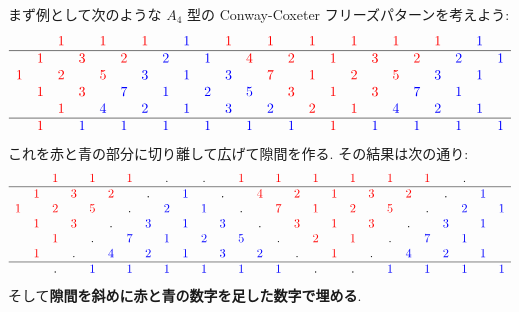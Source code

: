 \documentclass[12pt,twoside,dvipdfm]{jarticle}
\newcommand\red{\color{red}}
\newcommand\blue{\color{blue}}
\renewcommand\r{\red}
\renewcommand\b{\blue}
\theoremstyle{definition} %
\theoremstyle{definition} %
\theoremstyle{definition} %
\numberwithin{theorem}{section}
\numberwithin{equation}{section}
\numberwithin{figure}{section}
\numberwithin{table}{section}
\begin{document}
まず例として次のような $A_4$ 型の Conway-Coxeter フリーズパターンを考えよう:
\begin{equation*}
\begin{array}{cccccccccccccccccccccccc}
   &   &\r1&   &\r1&   &\r1&   &\b1&   &\r1&   &\r1&   &\r1&   &\r1&   &\r1&   &\r1&   &\b1&   \\ \hline
   &\r1&   &\r3&   &\r2&   &\b2&   &\b1&   &\r4&   &\r2&   &\r1&   &\r3&   &\r2&   &\b2&   &\b1\\
\r1&   &\r2&   &\r5&   &\b3&   &\b1&   &\b3&   &\r7&   &\r1&   &\r2&   &\r5&   &\b3&   &\b1&   \\
   &\r1&   &\r3&   &\b7&   &\b1&   &\b2&   &\b5&   &\r3&   &\r1&   &\r3&   &\b7&   &\b1&   &   \\
   &   &\r1&   &\b4&   &\b2&   &\b1&   &\b3&   &\b2&   &\r2&   &\r1&   &\b4&   &\b2&   &\b1&   \\ \hline
   &\r1&   &\b1&   &\b1&   &\b1&   &\b1&   &\b1&   &\b1&   &\r1&   &\b1&   &\b1&   &\b1&   &\b1\\
\end{array}
\end{equation*}
これを{\r 赤}と{\b 青}の部分に切り離して広げて隙間を作る.
その結果は次の通り:
\begin{equation*}
\begin{array}{cccccccccccccccccccccccccccc}
   &   &\r1&   &\r1&   &\r1&   & . &   & . &   &\r1&   &\r1&   &\r1&   &\r1&   &\r1&   &\r1&   & . &   &   \\ \hline
   &\r1&   &\r3&   &\r2&   & . &   &\b1&   & . &   &\r4&   &\r2&   &\r1&   &\r3&   &\r2&   & . &   &\b1&   \\
\r1&   &\r2&   &\r5&   & . &   &\b2&   &\b1&   & . &   &\r7&   &\r1&   &\r2&   &\r5&   & . &   &\b2&   &\b1\\
   &\r1&   &\r3&   & . &   &\b3&   &\b1&   &\b3&   & . &   &\r3&   &\r1&   &\r3&   & . &   &\b3&   &\b1&   \\
   &   &\r1&   & . &   &\b7&   &\b1&   &\b2&   &\b5&   & . &   &\r2&   &\r1&   & . &   &\b7&   &\b1&   &   \\
   &\r1&   & . &   &\b4&   &\b2&   &\b1&   &\b3&   &\b2&   & . &   &\r1&   & . &   &\b4&   &\b2&   &\b1&   \\ \hline
   &   & . &   &\b1&   &\b1&   &\b1&   &\b1&   &\b1&   &\b1&   & . &   & . &   &\b1&   &\b1&   &\b1&   &\b1\\
\end{array}
\end{equation*}
そして{\bf 隙間を斜めに{\r 赤}と{\b 青}の数字を足した数字で埋める}.
\end{document}
